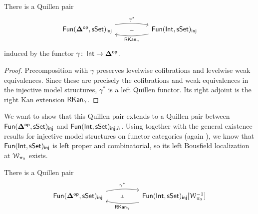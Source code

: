 \begin{proposition}\label{ch2:: prop: Quillen_pair_interval_simplicial_naive}
There is a Quillen pair
\begin{equation}
    \begin{tikzcd}[ampersand replacement=\&]
	{\fun(\bDelta^{\op},\sset)_{\mathsf{inj}}} \&\& {\fun(\Int,\sset)_{\mathsf{inj}}}
	\arrow[""{name=0, anchor=center, inner sep=0}, "{\gamma^*}", bend left=10, from=1-1, to=1-3]
	\arrow[""{name=1, anchor=center, inner sep=0}, "{\rkan_{\gamma}}", bend left=10, from=1-3, to=1-1]
	\arrow["\dashv"{anchor=center, rotate=-90}, draw=none, from=1, to=0]
    \end{tikzcd}
\end{equation}
induced by the functor $\gamma\colon \operatorname{\mathsf{Int}} \to \mathbf\Delta^{\mathsf{op}}$. 
\end{proposition}

\begin{proof}
Precomposition with $\gamma$ preserves levelwise cofibrations and levelwise
weak equivalences. Since these are precisely the cofibrations and weak
equivalences in the injective model structures, $\gamma^*$ is a left Quillen
functor. Its right adjoint is the right Kan extension $\operatorname{{\sf RKan}}_\gamma$.
\end{proof}

We want to show that this Quillen pair extends to a Quillen pair between
$\operatorname{\sf Fun}(\mathbf\Delta^{\mathsf{op}},\operatorname{\sf sSet})_{\mathsf{inj}}$ and
$\operatorname{\sf Fun}(\operatorname{\mathsf{Int}},\operatorname{\sf sSet})_{\mathsf{inj},h}$. Using
 together with the general existence
results for injective model structures on functor categories (again
), we know that
$\operatorname{\sf Fun}(\operatorname{\mathsf{Int}},\operatorname{\sf sSet})_{\mathsf{inj}}$ is left proper and combinatorial, so its left
Bousfield localization at $\mathcal W_{\pi_0}$ exists.

\begin{proposition}
    There is a Quillen pair 
    \begin{equation}
    \begin{tikzcd}[ampersand replacement=\&]
	{\fun(\bDelta^{\op},\sset)_{\mathsf{inj}}} \&\& {\fun(\Int,\sset)_{\mathsf{inj}}[\cW_{\pi_0}^{-1}]}
	\arrow[""{name=0, anchor=center, inner sep=0}, "{\gamma^*}", bend left=10, from=1-1, to=1-3]
	\arrow[""{name=1, anchor=center, inner sep=0}, "{\rkan_{\gamma}}", bend left=10, from=1-3, to=1-1]
	\arrow["\dashv"{anchor=center, rotate=-90}, draw=none, from=1, to=0]
    \end{tikzcd}
    \end{equation}
\end{proposition}

